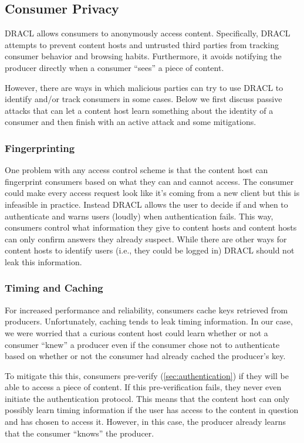 \documentclass[pdftex,12pt,a4papaer,twoside,notitlepage]{report}
\begin{document}
\subsection{Consumer Privacy}
\label{sec:consumer_privacy}

DRACL allows consumers to anonymously access content. Specifically, DRACL
attempts to prevent content hosts and untrusted third parties from tracking
consumer behavior and browsing habits. Furthermore, it avoids notifying the
producer directly when a consumer ``sees'' a piece of content.

However, there are ways in which malicious parties can try to use DRACL to
identify and/or track consumers in some cases. Below we first discuss passive
attacks that can let a content host learn something about the identity of a
consumer and then finish with an active attack and some mitigations.

\subsubsection{Fingerprinting}
\label{sec:fingerprinting}

One problem with any access control scheme is that the content host can
fingerprint consumers based on what they can and cannot access. The consumer
could make every access request look like it's coming from a new client but this
is infeasible in practice. Instead DRACL allows the user to decide if and when
to authenticate and warns users (loudly) when authentication fails. This way,
consumers control what information they give to content hosts and content hosts
can only confirm answers they already suspect. While there are other ways for
content hosts to identify users (i.e., they could be logged in) DRACL should not
leak this information.

\subsubsection{Timing and Caching}
\label{sec:timing}

For increased performance and reliability, consumers cache keys retrieved from
producers. Unfortunately, caching tends to leak timing information. In our
case, we were worried that a curious content host could learn whether or not a
consumer ``knew'' a producer even if the consumer chose not to authenticate
based on whether or not the consumer had already cached the producer's key.

To mitigate this this, consumers pre-verify (\cref{sec:authentication}) if they
will be able to access a piece of content. If this pre-verification fails, they
never even initiate the authentication protocol. This means that the content
host can only possibly learn timing information if the user has access to the
content in question and has chosen to access it. However, in this case, the
producer already learns that the consumer ``knows'' the producer.
\end{document}
